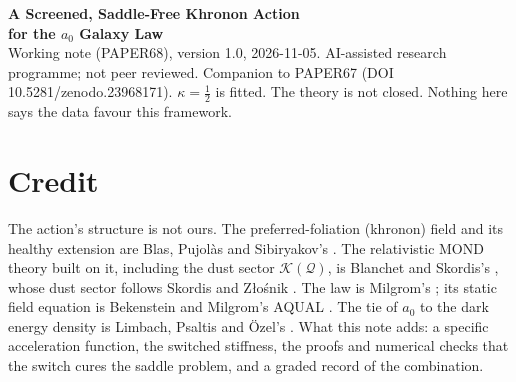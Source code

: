 \documentclass[10pt]{article}
\begin{document}
\begin{center}
{\Large\bfseries A Screened, Saddle-Free Khronon Action\\ for the $a_0$ Galaxy Law}\\[6pt]
{\small Working note (PAPER68), version 1.0, 2026-11-05. AI-assisted research programme; not peer reviewed. Companion to PAPER67 (DOI 10.5281/zenodo.23968171). $\kappa=\tfrac12$ is fitted. The theory is not closed. Nothing here says the data favour this framework.}
\end{center}

\begin{abstract}\noindent
We state, in one place, the action the programme adopted on 2026-11-04 for the galaxy law $g_N=g^2/(g+a_0)$, $a_0=\kappa c\sqrt{G\rho_{\rm DE}}$:
a Blanchet--Skordis Khronon theory \cite{BS} with a postulated acceleration function and one added term, a \emph{switched} stiffness $-(\gamma_L/2)[\max(D\!\cdot\!P,0)]^2$.
The switch is exact and adds no constant. It removes the Hadamard ill-posedness that an unswitched stiffness has wherever the khronon charge is negative, and it leaves every screened static solution unchanged.
In its stated scope (isolated galaxies, the Solar System, galaxy lensing and gravitational waves) the action reproduces the simple-$\mu$ law, passes Cassini by at least $4.8\times10^{7}$, gives $\gamma=\beta=1$ to $10^{-12}$, a tensor speed equal to $c$, and galaxy lensing equal to dynamics.
Outside that scope it fails: hosted dwarfs, linear growth, clusters and the radiation era, all through one identity that fixes the khronon dust's coupling at $\alpha\equiv1$.
$a_0$, the acceleration function and the screening length are put in by hand. We write down the identity a vacuum principle would have to supply to derive $\kappa$, and we state which health questions remain undecided.
\end{abstract}

\section{Credit}
The action's structure is not ours. The preferred-foliation (khronon) field and its healthy extension are Blas, Pujol\`as and Sibiryakov's \cite{BPS}. The relativistic MOND theory built on it, including the dust sector $\mathcal K(\mathcal Q)$, is Blanchet and Skordis's \cite{BS}, whose dust sector follows Skordis and Z\l{}o\'snik \cite{SZ}. The law is Milgrom's \cite{M83}; its static field equation is Bekenstein and Milgrom's AQUAL \cite{BM84}. The tie of $a_0$ to the dark energy density is Limbach, Psaltis and \"Ozel's \cite{LPO}.
What this note adds: a specific acceleration function, the switched stiffness, the proofs and numerical checks that the switch cures the saddle problem, and a graded record of the combination.
\end{document}
